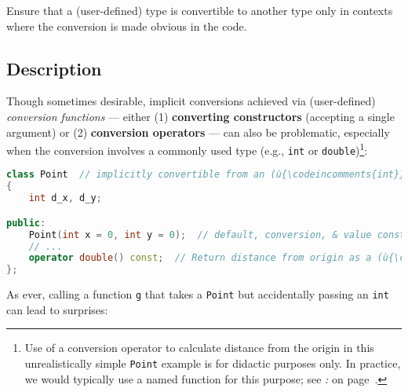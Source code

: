 

\setcounter{table}{0}
\setcounter{footnote}{0}
\setcounter{lstlisting}{0}


Ensure that a (user-defined) type is convertible to another type only in
contexts where the conversion is made obvious in the code.

\subsection[Description]{Description}\label{description-explicitconv}

Though sometimes desirable, implicit conversions achieved via (user-defined) \emph{conversion
functions} --- either (1) \textbf{converting constructors} (accepting a
single argument) or (2) \textbf{conversion operators} --- can also be problematic, especially when the
conversion involves a commonly used type (e.g., \texttt{int} or
\texttt{double}){\cprotect\footnote{Use of a conversion operator to
calculate distance from the origin in this unrealistically simple \texttt{Point}
example is for didactic purposes only. In practice, we would typically
use a named function for this purpose; see {\it{}: } on page~\pageref{sometimes-a-named-function-is-better}.}}:

\begin{lstlisting}[language=C++]
class Point  // implicitly convertible from an (ù{\codeincomments{int}}ù) or to a (ù{\codeincomments{double}}ù)
{
    int d_x, d_y;

public:
    Point(int x = 0, int y = 0);  // default, conversion, & value constructor
    // ...
    operator double() const;  // Return distance from origin as a (ù{\codeincomments{double}}ù).
};
\end{lstlisting}
    
\noindent As ever, calling a function \texttt{g} that takes a \texttt{Point} but
accidentally passing an \texttt{int} can lead to surprises:

